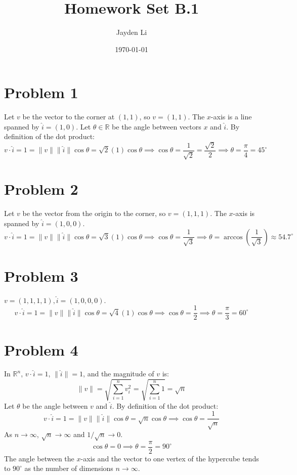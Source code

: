 \documentclass[preview, margin=0.6in]{standalone}
\title{\vspace*{-40pt}Homework Set B.1}
\author{Jayden Li}
\date{\today}
\newcommand*{\problem}[1]{\section*{Problem #1}}
\begin{document}
\fontsize{12pt}{12pt}\selectfont
\setlength{\abovedisplayskip}{\abovedisplayskip/2}
\setlength{\belowdisplayskip}{\belowdisplayskip/2}
\setlength{\parindent}{0pt}
\setlength{\parskip}{2ex plus 0.5ex minus 0.2ex}
\maketitle

\problem{1}
Let $v$ be the vector to the corner at $(1,1)$, so $v=(1,1)$. The $x$-axis is a line spanned by $\hat i=(1,0)$. Let $\theta\in\mathbb R$ be the angle between vectors $x$ and $\hat i$. By definition of the dot product:
\begin{equation*}
    v\cdot \hat i
	=1
	=\lVert v \rVert \lVert \hat i \rVert \cos\theta
	=\sqrt{2}(1)\cos\theta
	\implies \cos\theta=\frac{1}{\sqrt2}
	=\frac{\sqrt{2}}{2}
	\implies \theta=\frac{\pi}{4}=\boxed{45^\circ}
\end{equation*}

\problem{2}
Let $v$ be the vector from the origin to the corner, so $v=(1,1,1)$. The $x$-axis is spanned by $\hat i=(1,0,0)$.
\begin{equation*}
    v\cdot \hat i
	=1
	=\lVert v \rVert \lVert \hat i \rVert \cos\theta
	=\sqrt{3}(1)\cos\theta
	\implies \cos\theta=\frac{1}{\sqrt3}
	\implies \theta=\arccos\left(\frac{1}{\sqrt{3}}\right)
	\approx \boxed{54.7^\circ}
\end{equation*}

\problem{3}
$v=(1,1,1,1),\hat i=(1,0,0,0)$.
\begin{equation*}
    v\cdot \hat i
	=1
	=\lVert v \rVert \lVert \hat i \rVert \cos\theta
	=\sqrt{4}(1)\cos\theta
	\implies \cos\theta=\frac{1}{2}
	\implies \theta=\frac{\pi}{3}=\boxed{60^\circ}
\end{equation*}

\problem{4}
In $\mathbb R^n$, $v\cdot \hat i=1$, $\lVert \hat i \rVert =1$, and the magnitude of $v$ is:
\begin{equation*}
    \lVert v \rVert 
	=\sqrt{\sum_{i=1}^{n}v_i^2}
	=\sqrt{\sum_{i=1}^{n}1}
	=\sqrt{n}
\end{equation*}
Let $\theta$ be the angle between $v$ and $\hat i$. By definition of the dot product:
\begin{equation*}
	v\cdot\hat i=1
	=\lVert v \rVert \lVert \hat i \rVert \cos\theta
	=\sqrt{n}\cos\theta
	\implies \cos\theta=\frac{1}{\sqrt{n}}
\end{equation*}
As $n\to\infty$, $\sqrt{n}\to \infty$ and $1/ \sqrt{n}\to0$.
\begin{equation*}
    \cos\theta=0
	\implies \theta=\frac{\pi}{2}=\boxed{90^\circ}
\end{equation*}
The angle between the $x$-axis and the vector to one vertex of the hypercube tends to $90^\circ$ as the number of dimensions $n\to\infty$.
\end{document}
